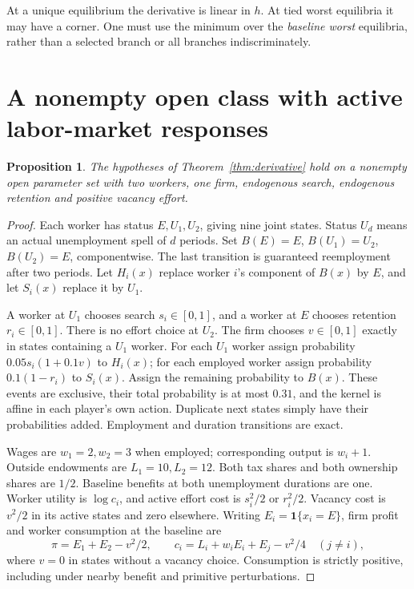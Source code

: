 \documentclass[11pt]{article}
\newtheorem{proposition}{Proposition}
\newcommand{\ind}{\mathbf1}
\begin{document}
At a unique equilibrium the derivative is linear in $h$. At tied worst equilibria it may have a corner. One must use the minimum over the \emph{baseline worst} equilibria, rather than a selected branch or all branches indiscriminately.

\section{A nonempty open class with active labor-market responses}
\begin{proposition}\label{prop:example}
The hypotheses of Theorem~\ref{thm:derivative} hold on a nonempty open parameter set with two workers, one firm, endogenous search, endogenous retention and positive vacancy effort.
\end{proposition}
\begin{proof}
Each worker has status $E,U_1,U_2$, giving nine joint states. Status $U_d$ means an actual unemployment spell of $d$ periods. Set $B(E)=E$, $B(U_1)=U_2$, $B(U_2)=E$, componentwise. The last transition is guaranteed reemployment after two periods. Let $H_i(x)$ replace worker $i$'s component of $B(x)$ by $E$, and let $S_i(x)$ replace it by $U_1$.

A worker at $U_1$ chooses search $s_i\in[0,1]$, and a worker at $E$ chooses retention $r_i\in[0,1]$. There is no effort choice at $U_2$. The firm chooses $v\in[0,1]$ exactly in states containing a $U_1$ worker. For each $U_1$ worker assign probability $0.05s_i(1+0.1v)$ to $H_i(x)$; for each employed worker assign probability $0.1(1-r_i)$ to $S_i(x)$. Assign the remaining probability to $B(x)$. These events are exclusive, their total probability is at most $0.31$, and the kernel is affine in each player's own action. Duplicate next states simply have their probabilities added. Employment and duration transitions are exact.

Wages are $w_1=2,w_2=3$ when employed; corresponding output is $w_i+1$. Outside endowments are $L_1=10,L_2=12$. Both tax shares and both ownership shares are $1/2$. Baseline benefits at both unemployment durations are one. Worker utility is $\log c_i$, and active effort cost is $s_i^2/2$ or $r_i^2/2$. Vacancy cost is $v^2/2$ in its active states and zero elsewhere. Writing $E_i=\ind\{x_i=E\}$, firm profit and worker consumption at the baseline are
\[
 \pi=E_1+E_2-v^2/2,\qquad
 c_i=L_i+w_iE_i+E_j-v^2/4\quad(j\ne i),
\]
where $v=0$ in states without a vacancy choice. Consumption is strictly positive, including under nearby benefit and primitive perturbations.


\end{proof}
\end{document}
